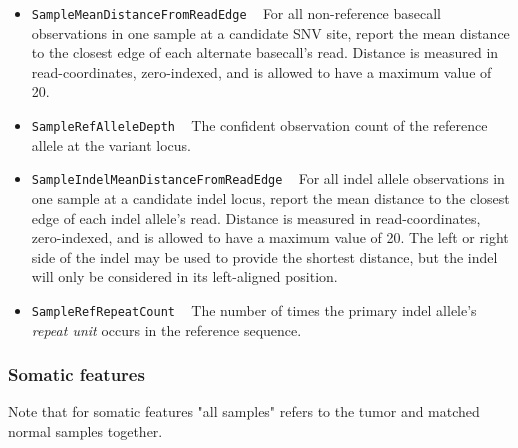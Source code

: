 \documentclass{article}
\begin{document}
\begin{itemize}
    \item \texttt{SampleMeanDistanceFromReadEdge} ~ For all non-reference basecall observations in one sample at a candidate SNV site, report the mean distance to the closest edge of each alternate basecall's read. Distance is measured in read-coordinates, zero-indexed, and is allowed to have a maximum value of 20.

    \item \texttt{SampleRefAlleleDepth} ~ The confident observation count of the reference allele at the variant locus.

    \item \texttt{SampleIndelMeanDistanceFromReadEdge} ~ For all indel allele observations in one sample at a candidate indel locus, report the mean distance to the closest edge of each indel allele's read. Distance is measured in read-coordinates, zero-indexed, and is allowed to have a maximum value of 20. The left or right side of the indel may be used to provide the shortest distance, but the indel will only be considered in its left-aligned position.

    \item \texttt{SampleRefRepeatCount} ~ The number of times the primary indel allele's \emph{repeat unit} occurs in the reference sequence.

\end{itemize}


\subsubsection{Somatic features}

Note that for somatic features "all samples" refers to the tumor and matched normal samples together.
\end{document}
